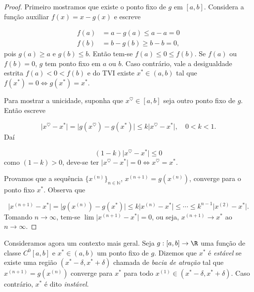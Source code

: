\documentclass{article}
\begin{document}
\begin{proof}
    Primeiro mostramos que existe o ponto fixo de \(g\) em \([a,b]\). Considera a função auxiliar \(f(x) = x-g(x)\) e escreve

    \begin{align*}
        f(a) &= a - g(a) \leq a - a = 0 \\
        f(b) &= b - g(b) \geq b - b = 0,
    \end{align*}
    pois \(g(a) \geq a\) e \(g(b) \leq b\). Então tem-se \(f(a) \leq 0 \leq f(b)\). Se \(f(a)\) ou \(f(b) = 0\), \(g\) tem ponto fixo em \(a\) ou \(b\). Caso contrário, vale a desigualdade estrita \(f(a) < 0 < f(b)\) e do TVI existe \(x^{*} \in (a,b)\) tal que \(f(x^{*}) = 0 \iff g(x^{*}) = x^{*}\).

    Para mostrar a unicidade, suponha que \(x^{\heartsuit} \in [a,b]\) seja outro ponto fixo de \(g\). Então escreve

    \begin{equation*}
        \vert x^{\heartsuit} - x^{*} \vert = \vert g(x^{\heartsuit}) - g(x^{*}) \vert \leq k \vert x^{\heartsuit} - x^{*} \vert, \quad 0<k<1.
    \end{equation*}
    Daí 

    \begin{equation*}
        (1-k) \vert x^{\heartsuit} - x^{*} \vert \leq 0
    \end{equation*}
    como \((1-k) > 0\), deve-se ter \(\vert x^{\heartsuit} - x^{*} \vert = 0 \iff x^{\heartsuit} = x^{*}\).

    Provamos que a sequência \(\{x^{(n)}\}_{n \in \mathbb{N}}\), \(x^{(n+1)} = g(x^{(n)})\), converge para o ponto fixo \(x^{*}\). Observa que

    \begin{equation*}
        \vert x^{(n+1)} - x^{*} \vert = \vert g(x^{(n)}) - g(x^{*}) \vert \leq k \vert x^{(n)} - x^{*} \vert \leq \cdots \leq k^{n-1} \vert x^{(2)} - x^{*} \vert.
    \end{equation*}
    Tomando \(n \to \infty\), tem-se \(\lim \vert x^{(n+1)} - x^{*} \vert = 0\), ou seja, \(x^{(n+1)} \to x^{*}\) ao \(n \to \infty\).
\end{proof}

Consideramos agora um contexto mais geral. Seja \(g: [a,b] \to \R\) uma função de classe \(C^0[a,b]\) e \(x^{*} \in (a,b)\) um ponto fixo de \(g\). Dizemos que \(x^{*}\) é \emph{estável} se existe uma região \((x^{*}-\delta, x^{*}+\delta)\) chamada de \emph{bacia de atração} tal que \(x^{(n+1)} = g(x^{(n)})\) converge para \(x^{*}\) para todo \(x^{(1)} \in (x^{*}-\delta, x^{*}+\delta)\). Caso contrário, \(x^{*}\) é dito \emph{instável}.
\end{document}
